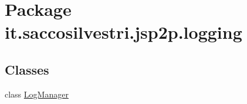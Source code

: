 \hypertarget{namespaceit_1_1saccosilvestri_1_1jsp2p_1_1logging}{
\section{\-Package it.saccosilvestri.jsp2p.logging}
\label{namespaceit_1_1saccosilvestri_1_1jsp2p_1_1logging}
}
\subsection*{\-Classes}
\begin{DoxyCompactItemize}
\item 
class \hyperlink{classit_1_1saccosilvestri_1_1jsp2p_1_1logging_1_1_log_manager}{\-Log\-Manager}
\end{DoxyCompactItemize}
